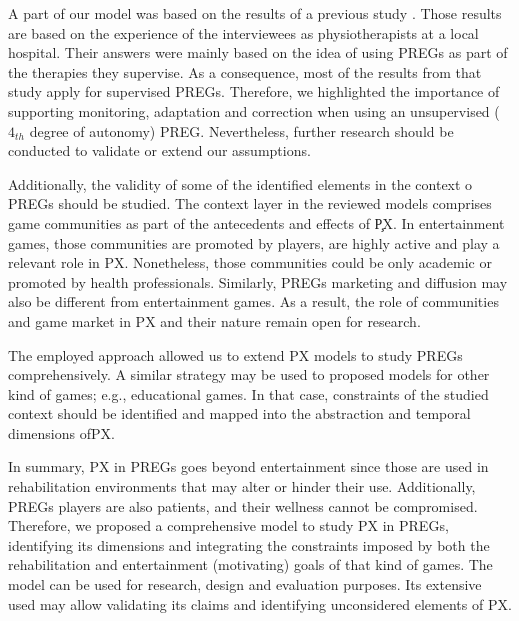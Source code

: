 A part of our model was based on the results of a previous study . Those results are based on the experience of the interviewees as physiotherapists at a local hospital. Their answers were mainly based on the idea of using \acp{PREG} as part of the therapies they supervise. As a consequence, most of the results from that study apply for supervised \acp{PREG}. Therefore, we highlighted the importance of supporting monitoring, adaptation and correction when using an unsupervised ($4_{th}$ degree of autonomy) \ac{PREG}. Nevertheless, further research should be conducted to validate or extend our assumptions.

Additionally, the validity of some of the identified elements in the context o \acp{PREG} should be studied. The context layer in the reviewed models comprises game communities as part of the antecedents and effects of \c{PX}. In entertainment games, those communities are promoted by players, are highly active and play a relevant role in \ac{PX}. Nonetheless, those communities could be only academic or promoted by health professionals. Similarly, \acp{PREG} marketing and diffusion may also be different from entertainment games. As a result, the role of communities and game market in \ac{PX} and their nature remain open for research.

The employed approach allowed us to extend \ac{PX} models to study \acp{PREG} comprehensively. A similar strategy may be used to proposed models for other kind of games; e.g., educational games. In that case, constraints of the studied context should be identified and mapped into the abstraction and temporal dimensions of\ac{PX}.

In summary, \ac{PX} in \acp{PREG} goes beyond entertainment since those are used in rehabilitation environments that may alter or hinder their use. Additionally, \acp{PREG} players are also patients, and their wellness cannot be compromised. Therefore, we proposed a comprehensive model to study \ac{PX} in \acp{PREG}, identifying its dimensions and integrating the constraints imposed by both the rehabilitation and entertainment (motivating) goals of that kind of games. The model can be used for research, design and evaluation purposes. Its extensive used may allow validating its claims and identifying unconsidered elements of \ac{PX}. 

